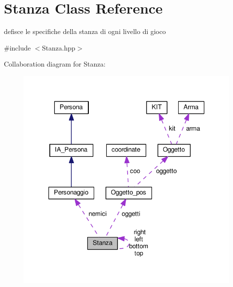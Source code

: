 \hypertarget{classStanza}{}\section{Stanza Class Reference}
\label{classStanza}


defisce le specifiche della stanza di ogni livello di gioco  




{\ttfamily \#include $<$Stanza.\+hpp$>$}



Collaboration diagram for Stanza\+:\nopagebreak
\begin{figure}[H]
\begin{center}
\leavevmode
\includegraphics[width=323pt]{classStanza__coll__graph}
\end{center}
\end{figure}
